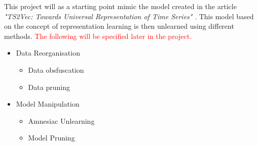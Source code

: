 This project will as a starting point mimic the model created in the article \textit{"TS2Vec: Towards Universal Representation of Time Series"} \cite{yue_ts2vec_2022}. This model based on the concept of representation learning is then unlearned using different methods. \textcolor{red}{The following will be specified later in the project.}
\begin{itemize}
    \item Data Reorganisation
    \begin{itemize}
        \item Data obsfuscation
        \item Data pruning
    \end{itemize}
    \item Model Manipulation
    \begin{itemize}
        \item Amnesiac Unlearning
        \item Model Pruning
    \end{itemize}
\end{itemize}
